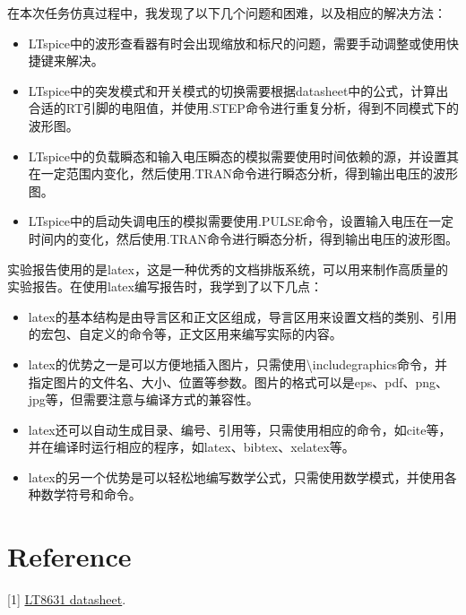 \documentclass[lang=cn,10pt]{elegantbook}
\begin{document}
在本次任务仿真过程中，我发现了以下几个问题和困难，以及相应的解决方法：

\begin{itemize}
    \item LTspice中的波形查看器有时会出现缩放和标尺的问题，需要手动调整或使用快捷键来解决。
    \item LTspice中的突发模式和开关模式的切换需要根据datasheet中的公式，计算出合适的RT引脚的电阻值，并使用.STEP命令进行重复分析，得到不同模式下的波形图。
    \item LTspice中的负载瞬态和输入电压瞬态的模拟需要使用时间依赖的源，并设置其在一定范围内变化，然后使用.TRAN命令进行瞬态分析，得到输出电压的波形图。
    \item LTspice中的启动失调电压的模拟需要使用.PULSE命令，设置输入电压在一定时间内的变化，然后使用.TRAN命令进行瞬态分析，得到输出电压的波形图。
\end{itemize}


实验报告使用的是latex，这是一种优秀的文档排版系统，可以用来制作高质量的实验报告。在使用latex编写报告时，我学到了以下几点：

\begin{itemize}
    \item latex的基本结构是由导言区和正文区组成，导言区用来设置文档的类别、引用的宏包、自定义的命令等，正文区用来编写实际的内容。
    \item latex的优势之一是可以方便地插入图片，只需使用\textbackslash includegraphics命令，并指定图片的文件名、大小、位置等参数。图片的格式可以是eps、pdf、png、jpg等，但需要注意与编译方式的兼容性。
    \item latex还可以自动生成目录、编号、引用等，只需使用相应的命令，如cite等，并在编译时运行相应的程序，如latex、bibtex、xelatex等。
    \item latex的另一个优势是可以轻松地编写数学公式，只需使用数学模式，并使用各种数学符号和命令。
\end{itemize}

% 


\newrefcontext[sorting=none]
\printbibliography[heading=bibintoc, title=\ebibname]
% 

\section{Reference}

[1] \href{https://www.analog.com/media/en/technical-documentation/data-sheets/lt8631.pdf}{LT8631 datasheet}.
\end{document}
